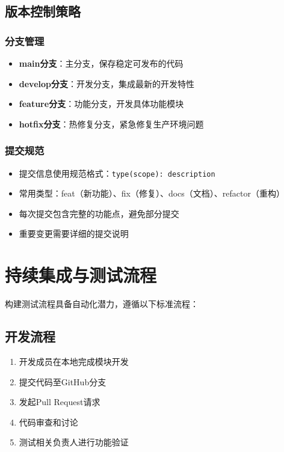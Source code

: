\documentclass[a4paper]{article}
\begin{document}
\subsection{版本控制策略}

\subsubsection{分支管理}

\begin{itemize}
    \item \textbf{main分支}：主分支，保存稳定可发布的代码
    \item \textbf{develop分支}：开发分支，集成最新的开发特性
    \item \textbf{feature分支}：功能分支，开发具体功能模块
    \item \textbf{hotfix分支}：热修复分支，紧急修复生产环境问题
\end{itemize}

\subsubsection{提交规范}

\begin{itemize}
    \item 提交信息使用规范格式：\texttt{type(scope): description}
    \item 常用类型：feat（新功能）、fix（修复）、docs（文档）、refactor（重构）
    \item 每次提交包含完整的功能点，避免部分提交
    \item 重要变更需要详细的提交说明
\end{itemize}

\section{持续集成与测试流程}

构建测试流程具备自动化潜力，遵循以下标准流程：

\subsection{开发流程}

\begin{enumerate}
    \item 开发成员在本地完成模块开发
    \item 提交代码至GitHub分支
    \item 发起Pull Request请求
    \item 代码审查和讨论
    \item 测试相关负责人进行功能验证
\end{enumerate}
\end{document}
